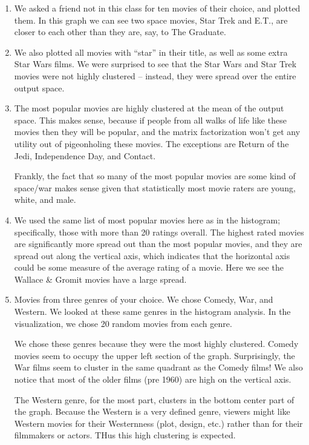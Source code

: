 \begin{enumerate}
    \item We asked a friend not in this class for ten movies of their choice, and plotted them. In this graph we can see two space movies, Star Trek and E.T., are closer to each other than they are, say, to The Graduate.
    \item We also plotted all movies with ``star'' in their title, as well as some extra Star Wars films. We were surprised to see that the Star Wars and Star Trek movies were not highly clustered -- instead, they were spread over the entire output space.
    \item The most popular movies are highly clustered at the mean of the output space. This makes sense, because if people from all walks of life like these movies then they will be popular, and the matrix factorization won't get any utility out of pigeonholing these movies. The exceptions are Return of the Jedi, Independence Day, and Contact.

    Frankly, the fact that so many of the most popular movies are some kind of space/war makes sense given that statistically most movie raters are young, white, and male.
    \item We used the same list of most popular movies here as in the histogram; specifically, those with more than 20 ratings overall. The highest rated movies are significantly more spread out than the most popular movies, and they are spread out along the vertical axis, which indicates that the horizontal axis could be some measure of the average rating of a movie. Here we see the Wallace \& Gromit movies have a large spread.
    \item Movies from three genres of your choice.  We chose Comedy, War, and Western. We looked at these same genres in the histogram analysis. In the visualization, we chose 20 random movies from each genre.

    We chose these genres because they were the most highly clustered. Comedy movies seem to occupy the upper left section of the graph. Surprisingly, the War films seem to cluster in the same quadrant as the Comedy films! We also notice that most of the older films (pre 1960) are high on the vertical axis.

    The Western genre, for the most part, clusters in the bottom center part of the graph. Because the Western is a very defined genre, viewers might like Western movies for their Westernness (plot, design, etc.) rather than for their filmmakers or actors. THus this high clustering is expected.
\end{enumerate}



